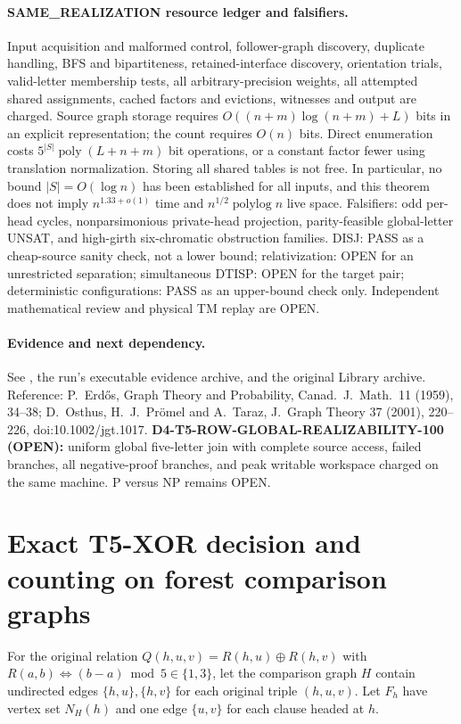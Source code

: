 \documentclass[11pt]{article}
\begin{document}
\paragraph{SAME\_REALIZATION resource ledger and falsifiers.}
Input acquisition and malformed control, follower-graph discovery,
duplicate handling, BFS and bipartiteness, retained-interface discovery,
orientation trials, valid-letter membership tests, all arbitrary-precision
weights, all attempted shared assignments, cached factors and
evictions, witnesses and output are charged. Source graph storage
requires $O((n+m)\log(n+m)+L)$ bits in an explicit representation;
the count requires $O(n)$ bits. Direct enumeration costs
$5^{|S|}\operatorname{poly}(L+n+m)$ bit operations, or a
constant factor fewer using translation normalization. Storing
all shared tables is not free. In particular, no bound
$|S|=O(\log n)$ has been established for all inputs, and this
theorem does not imply $n^{1.33+o(1)}$ time and
$n^{1/2}\operatorname{polylog}n$ live space.
Falsifiers: odd per-head cycles, nonparsimonious private-head
projection, parity-feasible global-letter UNSAT, and high-girth
six-chromatic obstruction families.
DISJ: PASS as a cheap-source sanity check, not a lower bound;
relativization: OPEN for an unrestricted separation;
simultaneous DTISP: OPEN for the target pair;
deterministic configurations: PASS as an upper-bound check only.
Independent mathematical review and physical TM replay are OPEN.

\paragraph{Evidence and next dependency.}
See ,
the run's executable evidence archive, and the original
Library archive. Reference: P.~Erd\H{o}s, Graph Theory and Probability,
Canad.\ J.\ Math.\ 11 (1959), 34--38; D.~Osthus,
H.~J.~Pr\"omel and A.~Taraz, J.\ Graph Theory 37 (2001), 220--226,
doi:10.1002/jgt.1017.
\textbf{D4-T5-ROW-GLOBAL-REALIZABILITY-100 (OPEN):}
uniform global five-letter join with complete source access,
failed branches, all negative-proof branches, and peak writable
workspace charged on the same machine.
P versus NP remains OPEN.


\section{Exact T5-XOR decision and counting on forest comparison graphs}
\label{sec:tmr4forest100}
For the original relation $Q(h,u,v)=R(h,u)\oplus R(h,v)$ with
$R(a,b)\Leftrightarrow (b-a)\bmod 5\in\{1,3\}$, let the comparison
graph $H$ contain undirected edges $\{h,u\},\{h,v\}$ for each original
triple $(h,u,v)$. Let $F_h$ have vertex set $N_H(h)$ and one edge
$\{u,v\}$ for each clause headed at $h$.
\end{document}
